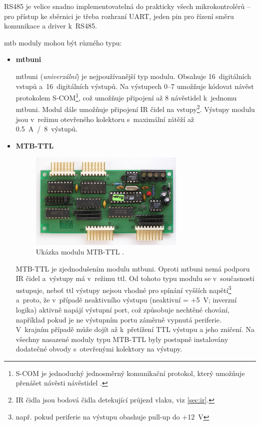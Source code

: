 RS485 je velice snadno implementovatelná do prakticky všech mikrokontrolérů –
pro přístup ke sběrnici je třeba rozhraní UART, jeden pin pro řízení směru
komunikace a driver k~RS485.

\gls{mtb} moduly mohou být různého typu:

\begin{itemize}
\item \textbf{\gls{mtbuni}}

	\gls{mtbuni} (\textit{univerzální}) je nejpoužívanější typ modulu. Obsahuje
	16~digitálních vstupů a~16~digitálních výstupů. Na výstupech 0–7 umožňuje
	kódovat návěst protokolem S-COM\footnote{S-COM je jednoduchý jednosměrný
	komunikační protokol, který umožňuje přenášet návěsti návěstidel
	\cite{scom-specs}.}, což umožňuje připojení až 8 návěstidel k~jednomu
	\gls{mtbuni}. Modul dále umožňuje připojení IR čidel na
	vstupy\footnote{IR čidla jsou bodová čidla detekující průjezd vlaku, viz
	\ref{sec:ir}.}. Výstupy modulu jsou v~režimu otevřeného kolektoru
	s~maximální zátěží až 0.5~A~/~8~výstupů.

\item \textbf{MTB-TTL}

	\begin{figure}[ht]
	\includegraphics[width=0.7\textwidth]{data/mtbttl_foto.jpg}
	\caption{Ukázka modulu MTB-TTL \cite{mtb:web}.}
	\label{fig:mtbttl}
	\end{figure}

	MTB-TTL je zjednodušením modulu \gls{mtbuni}. Oproti \gls{mtbuni}
	nemá podporu IR čidel a~výstupy má v~režimu \gls{ttl}. Od tohoto typu
	modulu se v~současnosti ustupuje, neboť \gls{ttl} výstupy nejsou vhodné pro
	spínání vyšších napětí\footnote{např. pokud periferie na výstupu obashuje
	pull-up do +12~V} a~proto, že v~případě neaktivního výstupu (neaktivní =
	+5~V; inverzní logika) aktivně napájí výstupní port, což způsobuje nechtěné
	chování, například pokud je ne výstupním portu záměrně vypnutá periferie.
	V~krajním případě může dojít až k~přetížení TTL výstupu a jeho zničení. Na
	všechny nasazené moduly typu MTB-TTL byly postupně instalovány dodatečné
	obvody s~otevřenými kolektory na výstupy.


\end{itemize}
